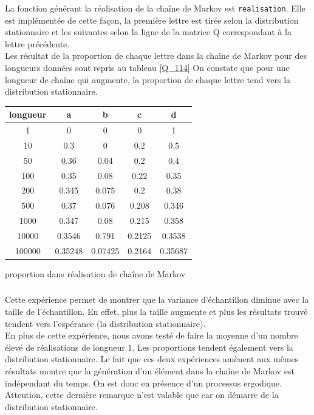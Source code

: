 \documentclass[11pt]{report}
\begin{document}
\subsubsection{}
La fonction générant la réalisation de la chaîne de Markov est \texttt{realisation}. Elle est implémentée de cette façon, la première lettre est tirée selon la distribution stationnaire et les suivantes selon la ligne de la matrice Q correspondant à la lettre précédente.\\
Les résultat de la proportion de chaque lettre dans la chaîne de Markov pour des longueurs données sont repris au tableau \ref{Q_114} On constate que pour une longueur de chaîne qui augmente, la proportion de chaque lettre tend vers la distribution stationnaire.
\begin{center}
\begin{threeparttable}
\begin{tabular}{|c|c|c|c|c|}
\hline
longueur & a & b & c & d \\
\hline
1 & 0 & 0 & 0 & 1 \\
\hline
10 & 0.3 & 0 & 0.2 & 0.5 \\
\hline
50 & 0.36 & 0.04 & 0.2 & 0.4 \\
\hline
100 & 0.35 & 0.08 & 0.22 & 0.35 \\
\hline
200 & 0.345 & 0.075 & 0.2 & 0.38 \\
\hline
500 & 0.37 & 0.076 & 0.208 & 0.346 \\
\hline
1000 & 0.347 & 0.08 & 0.215 & 0.358 \\
\hline
10000 & 0.3546 & 0.791 & 0.2125 & 0.3538 \\
\hline
100000 & 0.35248 & 0.07425 & 0.2164 & 0.35687\\ 
\hline
\end{tabular}
\caption{\label{Q_114}proportion dans réalisation de chaîne de Markov}
\end{threeparttable}
\end{center}
\subsubsection{}
Cette expérience permet de montrer que la variance d'échantillon diminue avec la taille de l'échantillon. En effet, plus la taille augmente et plus les résultats trouvé tendent vers l'espérance (la distribution stationnaire).\\
En plus de cette expérience, nous avons testé de faire la moyenne d'un nombre élevé de réalisations de longueur 1. Les proportions tendent également vers la distribution stationnaire. Le fait que ces deux expériences amènent aux mêmes résultats montre que la génération d'un élément dans la chaîne de Markov est indépendant du temps. On est donc en présence d'un processus ergodique. Attention, cette dernière remarque n'est valable que car on démarre de la distribution stationnaire.
\end{document}
